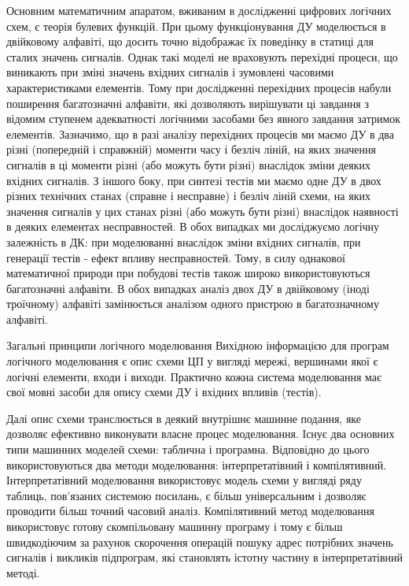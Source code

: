 \documentclass[12pt,a4paper]{article}
\begin{document}
Основним математичним апаратом, вживаним в дослідженні цифрових логічних схем, є теорія булевих функцій. При цьому функціонування ДУ моделюється в двійковому алфавіті, що досить точно відображає їх поведінку в статиці для сталих значень сигналів. Однак такі моделі не враховують перехідні процеси, що виникають при зміні значень вхідних сигналів і зумовлені часовими характеристиками елементів. Тому при дослідженні перехідних процесів набули поширення багатозначні алфавіти, які дозволяють вирішувати ці завдання з відомим ступенем адекватності логічними засобами без явного завдання затримок елементів. Зазначимо, що в разі аналізу перехідних процесів ми маємо ДУ в два різні (попередній і справжній) моменти часу і безліч ліній, на яких значення сигналів в ці моменти різні (або можуть бути різні) внаслідок зміни деяких вхідних сигналів. З іншого боку, при синтезі тестів ми маємо одне ДУ в двох різних технічних станах (справне і несправне) і безліч ліній схеми, на яких значення сигналів у цих станах різні (або можуть бути різні) внаслідок наявності в деяких елементах несправностей. В обох випадках ми досліджуємо логічну залежність в ДК: при моделюванні внаслідок зміни вхідних сигналів, при генерації тестів - ефект впливу несправностей. Тому, в силу однакової математичної природи при побудові тестів також широко використовуються багатозначні алфавіти. В обох випадках аналіз двох ДУ в двійковому (іноді троїчному) алфавіті замінюється аналізом одного пристрою в багатозначному алфавіті.


Загальні принципи логічного моделювання
Вихідною інформацією для програм логічного моделювання є опис схеми ЦП у вигляді мережі, вершинами якої є логічні елементи, входи і виходи. Практично кожна система моделювання має свої мовні засоби для опису схеми ДУ і вхідних впливів (тестів).

Далі опис схеми транслюється в деякий внутрішнє машинне подання, яке дозволяє ефективно виконувати власне процес моделювання. Існує два основних типи машинних моделей схеми: таблична і програмна. Відповідно до цього використовуються два методи моделювання: інтерпретатівний і компілятивний. Інтерпретатівний моделювання використовує модель схеми у вигляді ряду таблиць, пов'язаних системою посилань, є більш універсальним і дозволяє проводити більш точний часовий аналіз. Компілятивний метод моделювання використовує готову скомпільовану машинну програму і тому є більш швидкодіючим за рахунок скорочення операцій пошуку адрес потрібних значень сигналів і викликів підпрограм, які становлять істотну частину в інтерпретатівний методі.
\end{document}
